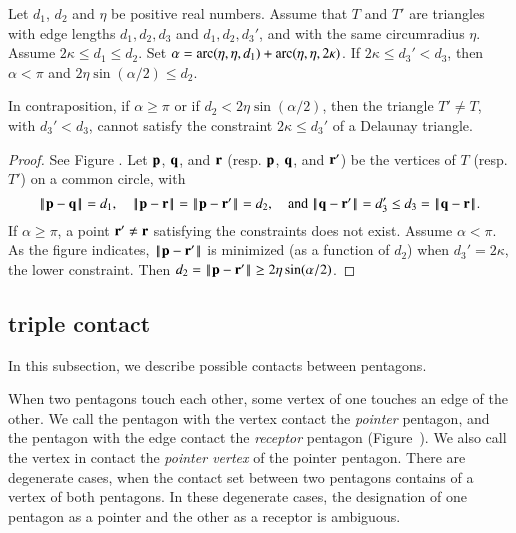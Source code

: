 \begin{lemma}  Let $d_1$, $d_2$
and  $\eta$ be positive real numbers.
Assume that $T$ and $T'$ are triangles with edge lengths
$d_1,d_2,d_3$ and $d_1,d_2,d_3'$,  and with the same circumradius
$\eta$. Assume $2\kappa\le d_1\le d_2$.  Set
 $\alpha = \operatorname{arc}(\eta,\eta,d_1)+\operatorname{arc}(\eta,\eta,2\kappa)$.
If $2\kappa \le d_3' < d_3$, then $\alpha < \pi$ and $2\eta\sin(\alpha/2) \le d_2$.
\end{lemma}

In contraposition, if $\alpha\ge\pi$ or if $d_2 < 2\eta\sin(\alpha/2)$,
then the triangle $T'\ne T$, with $d_3' < d_3$,
cannot satisfy the constraint $2\kappa\le d_3'$ of a  Delaunay triangle.


\begin{proof} See Figure .
Let ${\mathbf p}$, ${\mathbf q}$, and ${\mathbf r}$ (resp. ${\mathbf p}$, ${\mathbf q}$, and ${\mathbf r}'$) be the vertices of $T$
(resp. $T'$) on a common  circle, with
\[
\norm{\p}{\q} =d_1, \quad\norm{\p}{\r}=\norm{\p}{\r'}=d_2, \quad\text{and } 
\norm{\q}{\r'} = d_3' \le d_3=\norm{\q}{\r}.
\]
If $\alpha\ge\pi$, a point ${\mathbf r}'\ne {\mathbf r}$ satisfying the constraints does not exist.
Assume $\alpha < \pi$. 
As the figure indicates, $\norm{\p}{\r'}$ is minimized (as a function of $d_2$)
when $d_3' = 2\kappa$, the lower constraint.  Then
$d_2 = \norm{\p}{\r'}\ge 2\eta\sin(\alpha/2)$.
\end{proof}




\subsection{triple contact}

In this subsection, we describe possible contacts between pentagons.

When two pentagons touch each other, some vertex of one touches an
edge of the other.  We call the pentagon with the vertex contact the
{\it pointer} pentagon, and the pentagon with the edge contact the
{\it receptor} pentagon (Figure~).  We also call the
vertex in contact the {\it pointer vertex} of the pointer pentagon. There are
degenerate cases, when the contact set between two pentagons contains
of a vertex of both pentagons.  In these degenerate cases, the
designation of one pentagon as a pointer and the other as a receptor
is ambiguous.

